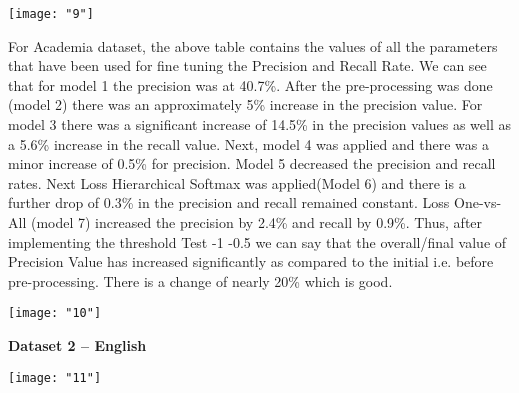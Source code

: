 \documentclass[12pt]{article}
\begin{document}
\begin{center}
	\begin{minipage}{\linewidth}
		\centering
		\texttt{[image: "9"]}
		
	\end{minipage}
\end{center}

\noindent For Academia dataset, the above table contains the values of all the parameters that have been used for fine tuning the Precision and Recall Rate. We can see that for model 1 the precision was at 40.7\%. After the pre-processing was done (model 2) there was an approximately 5\% increase in the precision value. For model 3 there was a significant increase of 14.5\% in the precision values as well as a 5.6\% increase in the recall value. Next, model 4 was applied and there was a minor increase of 0.5\% for precision. Model 5 decreased the precision and recall rates. Next Loss Hierarchical Softmax was applied(Model 6) and there is a further drop of 0.3\% in the precision and recall remained constant. Loss One-vs-All (model 7) increased the precision by 2.4\% and recall by 0.9\%. Thus, after implementing the threshold Test -1 -0.5 we can say that the overall/final value of Precision Value has increased significantly as compared to the initial i.e. before pre-processing. There is a change of nearly 20\% which is good.

\begin{center}
	\begin{minipage}{\linewidth}
		\centering
		\texttt{[image: "10"]}
		
	\end{minipage}
\end{center}


\noindent\textbf{Dataset 2 – English}

\begin{center}
	\begin{minipage}{\linewidth}
		\centering
		\texttt{[image: "11"]}
		
	\end{minipage}
\end{center}
\end{document}
